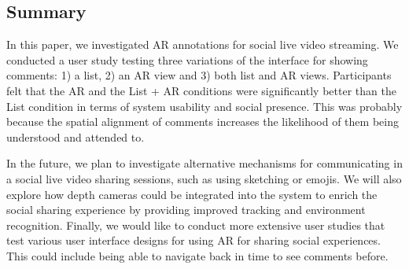 \subsection{Summary}

In this paper, we investigated AR annotations for social live video streaming. We conducted a user study testing three variations of the interface for showing comments: 1) a list, 2) an AR view and 3) both list and AR views. Participants felt that the AR and the List + AR conditions were significantly better than the List condition in terms of system usability and social presence. This was probably because the spatial alignment of comments increases the likelihood of them being understood and attended to.

In the future, we plan to investigate alternative mechanisms for communicating in a social live video sharing sessions, such as using sketching or emojis. We will also explore how depth cameras could be integrated into the system to enrich the social sharing experience by providing improved tracking and environment recognition. Finally, we would like to conduct more extensive user studies that test various user interface designs for using AR for sharing social experiences. This could include being able to navigate back in time to see comments before. 
